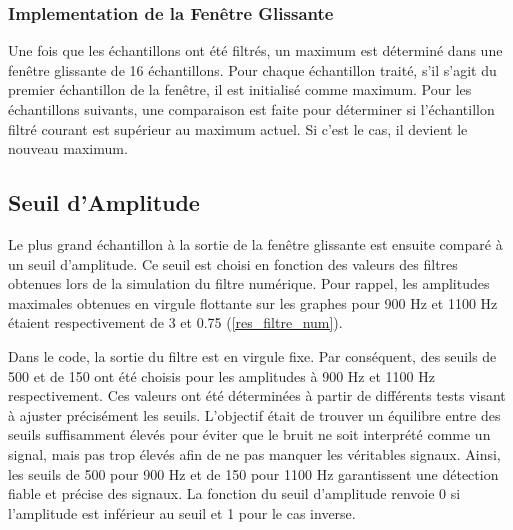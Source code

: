 \subsubsection{Implementation de la Fenêtre Glissante}
Une fois que les échantillons ont été filtrés, un maximum est déterminé dans une fenêtre glissante de 16 échantillons. Pour chaque échantillon traité, s'il s'agit du premier échantillon de la fenêtre, il est initialisé comme maximum. Pour les échantillons suivants, une comparaison est faite pour déterminer si l'échantillon filtré courant est supérieur au maximum actuel. Si c'est le cas, il devient le nouveau maximum.
\subsection{Seuil d'Amplitude}
Le plus grand échantillon à la sortie de la fenêtre glissante est ensuite comparé à un seuil d'amplitude. Ce seuil est choisi en fonction des valeurs des filtres obtenues lors de la simulation du filtre numérique. Pour rappel, les amplitudes maximales obtenues en virgule flottante sur les graphes pour 900 Hz et 1100 Hz étaient respectivement de 3 et 0.75 (\ref{res_filtre_num}).

Dans le code, la sortie du filtre est en virgule fixe. Par conséquent, des seuils de 500 et de 150 ont été choisis pour les amplitudes à 900 Hz et 1100 Hz respectivement. Ces valeurs ont été déterminées à partir de différents tests visant à ajuster précisément les seuils. L'objectif était de trouver un équilibre entre des seuils suffisamment élevés pour éviter que le bruit ne soit interprété comme un signal, mais pas trop élevés afin de ne pas manquer les véritables signaux. Ainsi, les seuils de 500 pour 900 Hz et de 150 pour 1100 Hz garantissent une détection fiable et précise des signaux. La fonction du seuil d'amplitude renvoie 0 si l'amplitude est inférieur au seuil et 1 pour le cas inverse.



